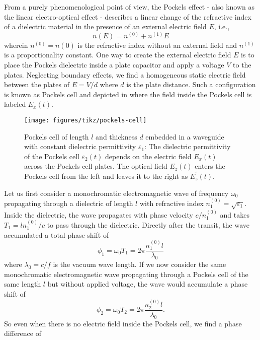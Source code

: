 From a purely phenomenological point of view, the Pockels effect - also known as the linear electro-optical effect - describes a linear change of the refractive index of a dielectric material in the presence of an external electric field $E$, i.e.,
\begin{equation}
	n(E)
	=
	n^{(0)}
	+
	n^{(1)}E
\end{equation}
wherein $n^{(0)}=n(0)$ is the refractive index without an external field and $n^{(1)}$ is a proportionality constant.
One way to create the external electric field $E$ is to place the Pockels dielectric inside a plate capacitor and apply a voltage $V$ to the plates.
Neglecting boundary effects, we find a homogeneous static electric field between the plates of $E=V/d$ where $d$ is the plate distance.
Such a configuration is known as Pockels cell and depicted in  where the field inside the Pockels cell is labeled $E_x(t)$.
\begin{figure}[htb]
    \centering
    \texttt{[image: figures/tikz/pockels-cell]}
    \caption{Pockels cell of length $l$ and thickness $d$ embedded in a waveguide with constant dielectric permittivity $\varepsilon_1$: The dielectric permittivity of the Pockels cell $\varepsilon_2(t)$ depends on the electric field $E_x(t)$ across the Pockels cell plates. The optical field $E_z(t)$ enters the Pockels cell from the left and leaves it to the right as $E^\prime_z(t)$.}\label{fig:pockels_cell}
\end{figure}
Let us first consider a monochromatic electromagnetic wave of frequency $\omega_0$ propagating through a dielectric of length $l$ with refractive index $n_1^{(0)}=\sqrt{\varepsilon_1}$.
Inside the dielectric, the wave propagates with phase velocity $c/n_1^{(0)}$ and takes $T_1=ln_1^{(0)}/c$ to pass through the dielectric.
Directly after the transit, the wave accumulated a total phase shift of
\begin{equation*}
	\phi_1
	=
	\omega_0T_1
	=
	2\pi\frac{n_1^{(0)}l}{\lambda_0}
\end{equation*}
where $\lambda_0=c/f$ is the vacuum wave length.
If we now consider the same monochromatic electromagnetic wave propagating through a Pockels cell of the same length $l$ but without applied voltage, the wave would accumulate a phase shift of
\begin{equation}
	\phi_2
	=
	\omega_0T_2
	=
	2\pi\frac{n_2^{(0)}l}{\lambda_0}
	.
\end{equation}
So even when there is no electric field inside the Pockels cell, we find a phase difference of

